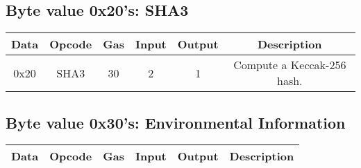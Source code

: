 \documentclass[10pt,a4paper,leqno,bibliography=totoc]{scrartcl}
\newenvironment{alphafootnotes}
{\par\edef\savedfootnotenumber{\number\value{footnote}}
\renewcommand{\thefootnote}{\alph{footnote}}
\setcounter{footnote}{0}}
{\par\setcounter{footnote}{\savedfootnotenumber}}
\begin{document}
\begin{alphafootnotes}
        \subsection{Byte value 0x20's: SHA3}
\begin{longtable}{|cccccc|}
\hline
        \textbf{Data} & \textbf{Opcode} & \textbf{Gas}  & \textbf{Input}  & \textbf{Output} & \textbf{Description} \\
\hline

	0x20 & SHA3 & 30 & 2 & 1 & Compute a Keccak-256 hash. \\
\hline
\end{longtable}

        \subsection{Byte value 0x30's: Environmental Information}
\begin{longtable}{|cccccc|}
\hline
        \textbf{Data} & \textbf{Opcode} & \textbf{Gas}  & \textbf{Input}  & \textbf{Output} & \textbf{Description} \\
\hline


\end{longtable}
\end{alphafootnotes}
\end{document}
